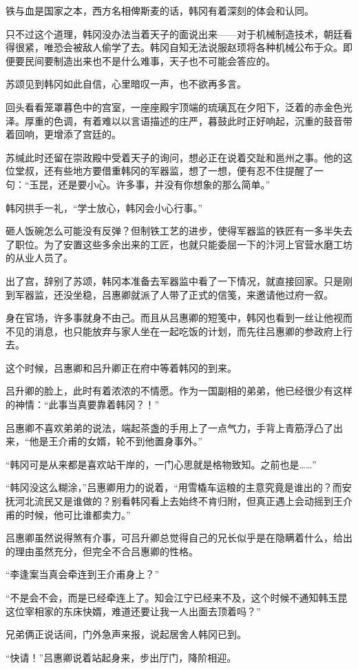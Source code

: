 铁与血是国家之本，西方名相俾斯麦的话，韩冈有着深刻的体会和认同。

只不过这个道理，韩冈没办法当着天子的面说出来——对于机械制造技术，朝廷看得很紧，唯恐会被敌人偷学了去。韩冈自知无法说服赵顼将各种机械公布于众。即便要民间要制造出来也不是什么难事，天子也不可能会答应的。

苏颂见到韩冈如此自信，心里暗叹一声，也不欲再多言。

回头看看笼罩暮色中的宫室，一座座殿宇顶端的琉璃瓦在夕阳下，泛着的赤金色光泽。厚重的色调，有着难以以言语描述的庄严，暮鼓此时正好响起，沉重的鼓音带着回响，更增添了宫廷的。

苏缄此时还留在崇政殿中受着天子的询问，想必正在说着交趾和邕州之事。他的这位堂叔，还有些地方要借重韩冈的军器监，想了一想，便有忍不住提醒了一句：“玉昆，还是要小心。许多事，并没有你想象的那么简单。”

韩冈拱手一礼，“学士放心，韩冈会小心行事。”

砸人饭碗怎么可能没有反弹？但制铁工艺的进步，使得军器监的铁匠有一多半失去了职位。为了安置这些多余出来的工匠，也就只能委屈一下的汴河上官营水磨工坊的从业人员了。

出了宫，辞别了苏颂，韩冈本准备去军器监中看了一下情况，就直接回家。只是刚到军器监，还没坐稳，吕惠卿就派了人带了正式的信笺，来邀请他过府一叙。

身在官场，许多事就身不由己。而且从吕惠卿的短笺中，韩冈也看到一丝让他视而不见的消息，也只能放弃与家人坐在一起吃饭的计划，而先往吕惠卿的参政府上行去。

这个时候，吕惠卿和吕升卿正在府中等着韩冈的到来。

吕升卿的脸上，此时有着浓浓的不情愿。作为一国副相的弟弟，他已经很少有这样的神情：“此事当真要靠着韩冈？！”

吕惠卿不喜欢弟弟的说法，端起茶盏的手用上了一点气力，手背上青筋浮凸了出来，“他是王介甫的女婿，轮不到他置身事外。”

“韩冈可是从来都是喜欢站干岸的，一门心思就是格物致知。之前也是……”

“韩冈没这么糊涂，”吕惠卿用力的说着，“用雪橇车运粮的主意究竟是谁出的？而安抚河北流民又是谁做的？别看韩冈看上去始终不肯归附，但真正遇上会动摇到王介甫的时候，他可比谁都卖力。”

吕惠卿虽然说得煞有介事，可吕升卿总觉得自己的兄长似乎是在隐瞒着什么，给出的理由虽然充分，但完全不合吕惠卿的性格。

“李逢案当真会牵连到王介甫身上？”

“不是会不会，而是已经牵连上了。知会江宁已经来不及，这个时候不通知韩玉昆这位宰相家的东床快婿，难道还要让我一人出面去顶着吗？”

兄弟俩正说话间，门外急声来报，说起居舍人韩冈已到。

“快请！”吕惠卿说着站起身来，步出厅门，降阶相迎。

